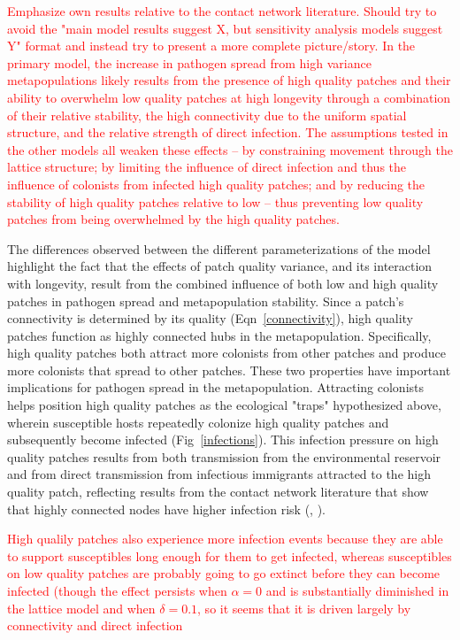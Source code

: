 \documentclass{svjour3}
\begin{document}
\textcolor{red}{Emphasize own results relative to the contact network literature.  Should try to avoid the "main model results suggest X, but sensitivity analysis models suggest Y" format and instead try to present a more complete picture/story.  In the primary model, the increase in pathogen spread from high variance metapopulations likely results from the presence of high quality patches and their ability to overwhelm low quality patches at high longevity through a combination of their relative stability, the high connectivity due to the uniform spatial structure, and the relative strength of direct infection.  The assumptions tested in the other models all weaken these effects -- by constraining movement through the lattice structure; by limiting the influence of direct infection and thus the influence of colonists from infected high quality patches; and by reducing the stability of high quality patches relative to low -- thus preventing low quality patches from being overwhelmed by the high quality patches.}

The differences observed between the different parameterizations of the model highlight the fact that the effects of patch quality variance, and its interaction with longevity, result from the combined influence of both low and high quality patches in pathogen spread and metapopulation stability.  Since a patch's connectivity is determined by its quality (Eqn~\ref{connectivity}), high quality patches function as highly connected hubs in the metapopulation.  Specifically, high quality patches both attract more colonists from other patches and produce more colonists that spread to other patches.  These two properties have important implications for pathogen spread in the metapopulation. Attracting colonists helps position high quality patches as the ecological "traps" hypothesized above, wherein susceptible hosts repeatedly colonize high quality patches and subsequently become infected (Fig~\ref{infections}).  This infection pressure on high quality patches results from both transmission from the environmental reservoir and from direct transmission from infectious immigrants attracted to the high quality patch, reflecting results from the contact network literature that show that highly connected nodes have higher infection risk (\cite{Christley2005}, \cite{Keeling2005}).  

\textcolor{red}{High qualily patches also experience more infection events because they are able to support susceptibles long enough for them to get infected, whereas susceptibles on low quality patches are probably going to go extinct before they can become infected (though the effect persists when $\alpha = 0$ and is substantially diminished in the lattice model and when $\delta = 0.1$, so it seems that it is driven largely by connectivity and direct infection}
\end{document}
